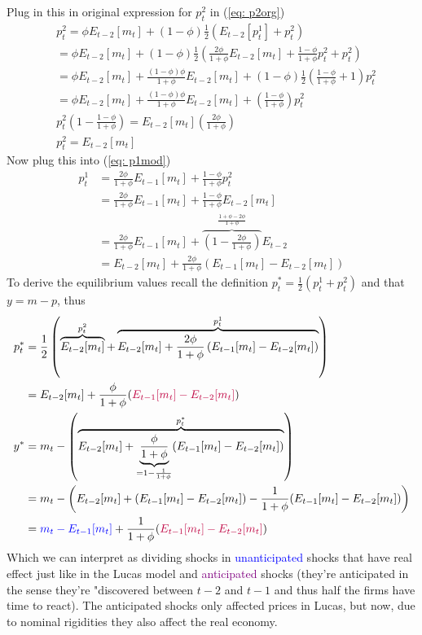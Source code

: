 \documentclass[12pt, a4paper]{article}
\begin{document}
\begin{spacing}{1.213}
Plug in this in original expression for $p_t^2$ in (\ref{eq: p2org})
\begin{align*}
&p_t^2 = \phi E_{t-2}[m_t] + (1-\phi) \frac{1}{2} (E_{t-2}[p_t^1] + p_t^2) \\
& = \phi E_{t-2}[m_t] + (1-\phi) \frac{1}{2} \left( \frac{2\phi}{1+\phi} E_{t-2}[m_t] + \frac{1-\phi}{1+\phi} p_t^2 + p_t^2\right) \\
& = \phi E_{t-2}[m_t] +  \frac{(1-\phi)\phi}{1+\phi} E_{t-2}[m_t] + (1-\phi) \frac{1}{2}\left( \frac{1-\phi}{1+\phi}+1 \right) p_t^2 \\
& = \phi E_{t-2}[m_t] +  \frac{(1-\phi)\phi}{1+\phi} E_{t-2}[m_t] +\left( \frac{1-\phi}{1+\phi} \right) p_t^2 \\ 
&p_t^2 \left(1- \frac{1-\phi}{1+\phi} \right) = E_{t-2}[m_t]\left( \frac{2\phi}{1+ \phi} \right) \\
&p_t^2 = E_{t-2}[m_t]
\end{align*}
Now plug this into (\ref{eq: p1mod})
\begin{align*}
 p_t^1 &= \frac{2\phi}{1+\phi} E_{t-1}[m_t] + \frac{1-\phi}{1+\phi} p_t^2 \\
&  = \frac{2\phi}{1+\phi} E_{t-1}[m_t] + \frac{1-\phi}{1+\phi} E_{t-2}[m_t] \\
& = \frac{2\phi}{1+\phi} E_{t-1}[m_t] + \overbrace{\left(1 - \frac{2\phi}{1+ \phi} \right)}^{\frac{1+\phi-2\phi}{1+\phi}}  E_{t-2}\\ 
& = E_{t-2}[m_t] + \frac{2\phi}{1+\phi} \left( E_{t-1}[m_t] - E_{t-2}[m_t] \right)
\end{align*}
To derive the equilibrium values recall the definition $p^*_t = \frac{1}{2}(p_t^1 + p_t^2)$ and that $y = m-p$, thus 
\begin{align*}
p_t^* &= \frac{1}{2} \left(\overbrace{E_{t-2}[m_t]}^{p_t^2} + \overbrace{ E_{t-2}[m_t] + \frac{2\phi}{1+\phi} \left( E_{t-1}[m_t] - E_{t-2}[m_t] \right)}^{p_t^1} \right) 
\\
& = E_{t-2}[m_t] + \frac{\phi}{1+\phi} (\textcolor{purple}{ E_{t-1}[m_t] - E_{t-2}[m_t]}) 
\\
y^* &= m_t - \left( \overbrace{E_{t-2}[m_t]  + \underbrace{\frac{\phi}{1+\phi}}_{=1-\frac{1}{1+\phi}} (E_{t-1}[m_t] - E_{t-2}[m_t])}^{p_t^*} \right)
\\
& = m_t  - \left( E_{t-2}[m_t] + (E_{t-1}[m_t] -E_{t-2}[m_t]) - \frac{1}{1+\phi}(E_{t-1}[m_t] - E_{t-2}[m_t])  
\right) 
\\
& = \textcolor{blue}{m_t - E_{t-1}[m_t]} + \frac{1}{1+ \phi}(\textcolor{purple}{E_{t-1}[m_t] -E_{t-2}[m_t]})
\end{align*}
Which we can interpret as dividing shocks in \textcolor{blue}{unanticipated} shocks that have real effect just like in the Lucas model and \textcolor{purple}{anticipated} shocks (they're anticipated in the sense they're "discovered between $t-2$ and $t-1$ and thus half the firms have time to react). The anticipated shocks only affected prices in Lucas, but now, due to nominal rigidities they also affect the real economy.


\end{spacing}
\end{document}
